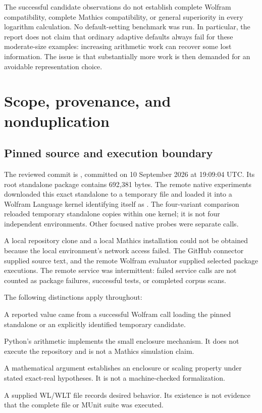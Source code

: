 \documentclass[11pt,letterpaper]{article}
\newcommand{\code}[1]{\texttt{\detokenize{#1}}}
\theoremstyle{remark}\newtheorem{remark}[proposition]{Remark}
\begin{document}
The successful candidate observations do not establish complete Wolfram
compatibility, complete Mathics compatibility, or general superiority in every
logarithm calculation. No default-setting benchmark was run. In particular,
the report does not claim that ordinary adaptive defaults always fail for
these moderate-size examples: increasing arithmetic work can recover some
lost information. The issue is that substantially more work is then demanded
for an avoidable representation choice.

\section{Scope, provenance, and nonduplication}
\subsection{Pinned source and execution boundary}
The reviewed commit is
, committed on
10 September 2026 at 19:09:04 UTC. Its root standalone package contains
692,381 bytes. The remote native experiments downloaded this exact standalone
to a temporary file and loaded it into a Wolfram Language kernel identifying
itself as \code{15.0.0 for Linux x86 (64-bit) (May 6, 2026)}.
The four-variant comparison reloaded temporary standalone copies within one
kernel; it is not four independent environments. Other focused native probes
were separate calls.\cite{source}

A local repository clone and a local Mathics installation could not be
obtained because the local environment's network access failed. The GitHub
connector supplied source text, and the remote Wolfram evaluator supplied
selected package executions. The remote service was intermittent: failed
service calls are not counted as package failures, successful tests, or
completed corpus scans.

The following distinctions apply throughout:
\begin{description}[style=nextline]
\item[Native observation]
A reported value came from a successful Wolfram call loading the pinned
standalone or an explicitly identified temporary candidate.
\item[Independent model]
Python's \code{Fraction} arithmetic implements the small enclosure mechanism.
It does not execute the repository and is not a Mathics simulation claim.
\item[Proof]
A mathematical argument establishes an enclosure or scaling property under
stated exact-real hypotheses. It is not a machine-checked formalization.
\item[Regression specification]
A supplied WL/WLT file records desired behavior. Its existence is not evidence
that the complete file or MUnit suite was executed.
\end{description}
\end{document}
